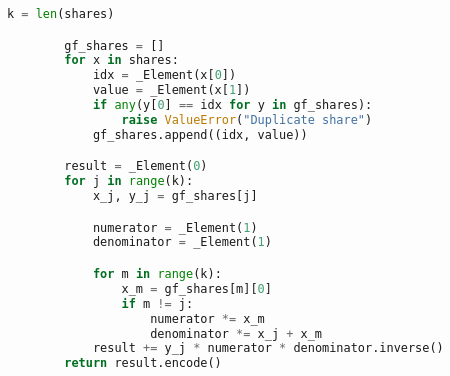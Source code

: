 \begin{lstlisting}[language = Python]
        k = len(shares)

        gf_shares = []
        for x in shares:
            idx = _Element(x[0])
            value = _Element(x[1])
            if any(y[0] == idx for y in gf_shares):
                raise ValueError("Duplicate share")
            gf_shares.append((idx, value))

        result = _Element(0)
        for j in range(k):
            x_j, y_j = gf_shares[j]

            numerator = _Element(1)
            denominator = _Element(1)

            for m in range(k):
                x_m = gf_shares[m][0]
                if m != j:
                    numerator *= x_m
                    denominator *= x_j + x_m
            result += y_j * numerator * denominator.inverse()
        return result.encode()
\end{lstlisting}

